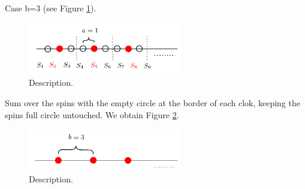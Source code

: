 \documentclass[../main/main.tex]{subfiles}
\begin{document}
Case b=3 (see Figure \ref{fig:20_1}).

\begin{figure}[h!]
\centering
\includegraphics[width=0.6\textwidth]{../lessons/20_image/1.pdf}
\caption{\label{fig:20_1} Description.}
\end{figure}

Sum over the spins with the empty circle at the border of each clok, keeping the spins full circle untouched.
We obtain Figure \ref{fig:20_2}.

\begin{figure}[h!]
\centering
\includegraphics[width=0.6\textwidth]{../lessons/20_image/2.pdf}
\caption{\label{fig:20_2} Description.}
\end{figure}
\end{document}

